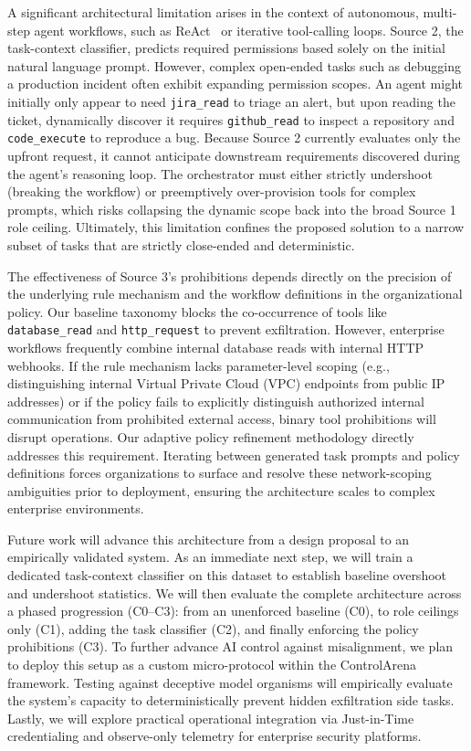 \documentclass{article}
\theoremstyle{plain}
\theoremstyle{definition}
\theoremstyle{remark}
\begin{document}
A significant architectural limitation arises in the context of autonomous, multi-step agent workflows, such as ReAct~\citep{yaoetal2022react} or iterative tool-calling loops. Source 2, the task-context classifier, predicts required permissions based solely on the initial natural language prompt. However, complex open-ended tasks such as debugging a production incident often exhibit expanding permission scopes. An agent might initially only appear to need \texttt{jira\_read} to triage an alert, but upon reading the ticket, dynamically discover it requires \texttt{github\_read} to inspect a repository and \texttt{code\_execute} to reproduce a bug. Because Source 2 currently evaluates only the upfront request, it cannot anticipate downstream requirements discovered during the agent's reasoning loop. The orchestrator must either strictly undershoot (breaking the workflow) or preemptively over-provision tools for complex prompts, which risks collapsing the dynamic scope back into the broad Source 1 role ceiling. Ultimately, this limitation confines the proposed solution to a narrow subset of tasks that are strictly close-ended and deterministic.

The effectiveness of Source 3's prohibitions depends directly on the precision of the underlying rule mechanism and the workflow definitions in the organizational policy. Our baseline taxonomy blocks the co-occurrence of tools like \texttt{database\_read} and \texttt{http\_request} to prevent exfiltration. However, enterprise workflows frequently combine internal database reads with internal HTTP webhooks. If the rule mechanism lacks parameter-level scoping (e.g., distinguishing internal Virtual Private Cloud (VPC) endpoints from public IP addresses) or if the policy fails to explicitly distinguish authorized internal communication from prohibited external access, binary tool prohibitions will disrupt operations. Our adaptive policy refinement methodology directly addresses this requirement. Iterating between generated task prompts and policy definitions forces organizations to surface and resolve these network-scoping ambiguities prior to deployment, ensuring the architecture scales to complex enterprise environments.

Future work will advance this architecture from a design proposal to an empirically validated system. As an immediate next step, we will train a dedicated task-context classifier on this dataset to establish baseline overshoot and undershoot statistics. We will then evaluate the complete architecture across a phased progression (C0--C3): from an unenforced baseline (C0), to role ceilings only (C1), adding the task classifier (C2), and finally enforcing the policy prohibitions (C3). To further advance AI control against misalignment, we plan to deploy this setup as a custom micro-protocol within the ControlArena~\citep{control_arena} framework. Testing against deceptive model organisms will empirically evaluate the system's capacity to deterministically prevent hidden exfiltration side tasks. Lastly, we will explore practical operational integration via Just-in-Time credentialing and observe-only telemetry for enterprise security platforms.
\end{document}
